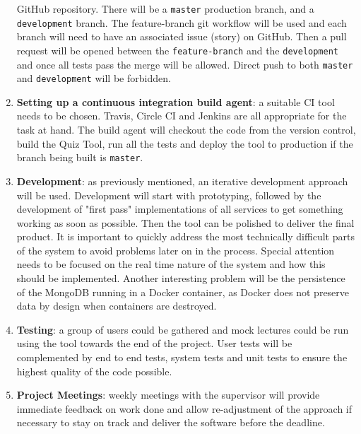 \documentclass[11pt,fleqn,twoside]{article}
\begin{document}
\begin{enumerate}
    GitHub\cite{6} repository. There will be a \texttt{master} production branch, and a \texttt{development} branch.
    The feature-branch git workflow \cite{7} will be used and each branch will need to have an associated issue (story)
    on GitHub. Then a pull request will be opened between the \texttt{feature-branch} and the \texttt{development}
    and once all tests pass the merge will be allowed. Direct push to both \texttt{master} and \texttt{development}
    will be forbidden.
  \item \textbf{Setting up a continuous integration build agent}: a suitable CI tool needs to be chosen. Travis\cite{8}, Circle CI\cite{9}
    and Jenkins\cite{10} are all appropriate for the task at hand. The build agent will checkout the code from the version control,
    build the Quiz Tool, run all the tests and deploy the tool to production if the branch being built is \texttt{master}.
  \item \textbf{Development}: as previously mentioned, an iterative development approach will be used. Development will start
    with prototyping, followed by the development of "first pass" implementations of all services to get something
    working as soon as possible. Then the tool can be polished to deliver the final product. It is important to quickly
    address the most technically difficult parts of the system to avoid problems later on in the process. Special
    attention needs to be focused on the real time nature of the system and how this should be implemented. Another
    interesting problem will be the persistence of the MongoDB running in a Docker container, as Docker does not
    preserve data by design when containers are destroyed.
  \item \textbf{Testing}: a group of users could be gathered and mock lectures could be run using the tool towards the
    end of the project. User tests will be complemented by end to end tests, system tests and unit tests to ensure
    the highest quality of the code possible.
  \item \textbf{Project Meetings}: weekly meetings with the supervisor will provide immediate feedback on work done
    and allow re-adjustment of the approach if necessary to stay on track and deliver the software before the deadline.
\end{enumerate}

\end{document}
